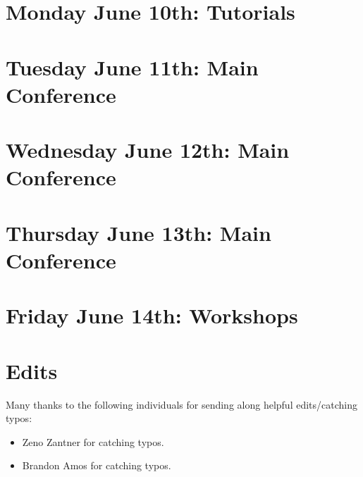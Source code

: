 \documentclass[11pt]{article}
\begin{document}
\newpage
\section{Monday June 10th: Tutorials}




\newpage
\section{Tuesday June 11th: Main Conference}




\newpage
\section{Wednesday June 12th: Main Conference}




\newpage
\section{Thursday June 13th: Main Conference}




\newpage
\section{Friday June 14th: Workshops}




\section*{Edits}

Many thanks to the following individuals for sending along helpful edits/catching typos:
\begin{itemize}
    \item Zeno Zantner for catching typos.
    \item Brandon Amos for catching typos.
\end{itemize}


\newpage


\end{document}
